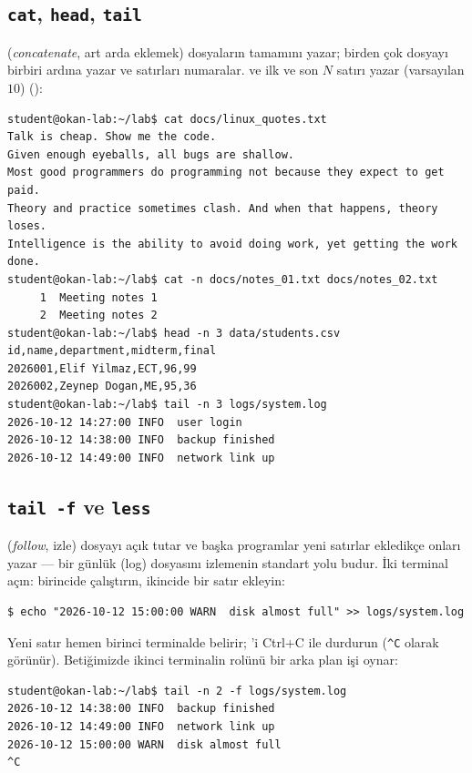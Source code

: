 \subsection{\texttt{cat}, \texttt{head}, \texttt{tail}}

 (\emph{concatenate}, art arda eklemek) dosyaların tamamını yazar; birden çok dosyayı birbiri ardına yazar ve  satırları numaralar.  ve  ilk ve son $N$ satırı yazar (varsayılan $10$) ():

\begin{lstlisting}[style=term]
student@okan-lab:~/lab$ cat docs/linux_quotes.txt
Talk is cheap. Show me the code.
Given enough eyeballs, all bugs are shallow.
Most good programmers do programming not because they expect to get paid.
Theory and practice sometimes clash. And when that happens, theory loses.
Intelligence is the ability to avoid doing work, yet getting the work done.
student@okan-lab:~/lab$ cat -n docs/notes_01.txt docs/notes_02.txt
     1  Meeting notes 1
     2  Meeting notes 2
student@okan-lab:~/lab$ head -n 3 data/students.csv
id,name,department,midterm,final
2026001,Elif Yilmaz,ECT,96,99
2026002,Zeynep Dogan,ME,95,36
student@okan-lab:~/lab$ tail -n 3 logs/system.log
2026-10-12 14:27:00 INFO  user login
2026-10-12 14:38:00 INFO  backup finished
2026-10-12 14:49:00 INFO  network link up
\end{lstlisting}

\subsection{\texttt{tail -f} ve \texttt{less}}

 (\emph{follow}, izle) dosyayı açık tutar ve başka programlar yeni satırlar ekledikçe onları yazar --- bir günlük (log) dosyasını izlemenin standart yolu budur. İki terminal açın: birincide  çalıştırın, ikincide bir satır ekleyin:
\begin{lstlisting}[style=term]
$ echo "2026-10-12 15:00:00 WARN  disk almost full" >> logs/system.log
\end{lstlisting}
Yeni satır hemen birinci terminalde belirir; 'i Ctrl+C ile durdurun (\texttt{\^{}C} olarak görünür). Betiğimizde ikinci terminalin rolünü bir arka plan işi oynar:

\begin{lstlisting}[style=term]
student@okan-lab:~/lab$ tail -n 2 -f logs/system.log
2026-10-12 14:38:00 INFO  backup finished
2026-10-12 14:49:00 INFO  network link up
2026-10-12 15:00:00 WARN  disk almost full
^C
\end{lstlisting}

